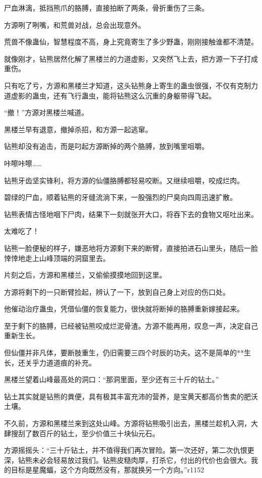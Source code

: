 \begin{this_body}
尸血淋漓，抵挡熊爪的胳膊，直接拍断了两条，骨折重伤了三条。

方源咧了咧嘴，和荒兽对战，总会出现意外。

荒兽不像蛊仙，智慧程度不高，身上究竟寄生了多少野蛊，刚刚接触谁都不清楚。

就像刚才，钻熊居然化解了黑楼兰的力道虚影，又突然飞上去，把方源一下子打成重伤。

只有吃了亏，方源和黑楼兰才知道，这头钻熊身上寄生的蛊虫很强，不仅有克制力道虚影的蛊虫，还有飞行蛊虫，能将钻熊这么沉重的身躯带得飞起。

“撤！”方源对黑楼兰喊道。

黑楼兰早有退意，撤掉杀招，和方源一起逃窜。

钻熊却没有追击，而是叼起方源断掉的两个胳膊，放到嘴里咀嚼。

咔嚓咔嚓……

钻熊牙齿坚实锋利，将方源的仙僵胳膊都轻易咬断。又继续咀嚼，咬成烂肉。

碧绿的尸血，顺着钻熊的牙缝流淌下来，一股强烈的尸臭向四周迅速扩散。

钻熊表情古怪地咽下尸肉，结果下一刻就张开大口，将吞下去的食物又呕吐出来。

太难吃了！

钻熊一脸便秘的样子，嫌恶地将方源剩下来的断臂，直接拍进石山里头，随后一脸悻悻地走上山峰顶端的洞窟里去。

片刻之后，方源和黑楼兰，又偷偷摸摸地回到这里。

方源将剩下的一只断臂捡起，辨认了一下，放到自己身上对应的伤口处。

他催动治疗蛊虫，凭借仙僵的恢复能力，很快就将断掉的胳膊重新嫁接起来。

至于剩下的胳膊，已经被钻熊咬成烂泥骨渣。方源不能再用，叹息一声，决定自己重新生长。

但仙僵并非凡体，要断肢重生，仍旧需要三四个时辰的功夫。这不是简单的**生长，还关乎力道道痕的补充。

黑楼兰望着山峰最高处的洞口：“那洞里面，至少还有三十斤的钻土。”

钻土其实就是钻熊的粪便，具有极其丰富充沛的营养，是宝黄天都高价售卖的肥沃土壤。

不久前，方源和黑楼兰来到这处山峰。方源将钻熊吸引出去，黑楼兰趁机入洞，大肆搜刮了数百斤的钻土，至少价值三十块仙元石。

方源摇摇头：“三十斤钻土，并不值得我们再次冒险。第一次还好，第二次仇恨更深，钻熊未必会轻易放过我们。钻熊皮糙肉厚，打杀它，付出的代价也会很大。我的目标是星魔蝠，这个方向既然没有，那就换另一个方向。”r1152

\end{this_body}

